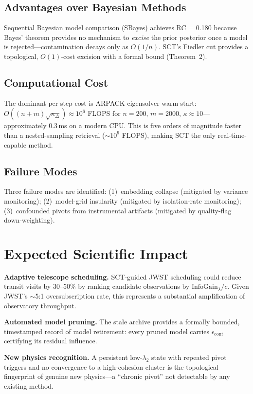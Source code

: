 \documentclass[conference]{IEEEtran}
\newcommand{\lam}{\lambda_2}
\newcommand{\epscont}{\epsilon_{\mathrm{cont}}}
\begin{document}
\subsection{Advantages over Bayesian Methods}
Sequential Bayesian model comparison (SBayes) achieves RC = 0.180 because
Bayes' theorem provides no mechanism to \emph{excise} the prior posterior
once a model is rejected---contamination decays only as $O(1/n)$.
SCT's Fiedler cut provides a topological, $O(1)$-cost excision with a formal
bound (Theorem~2).

\subsection{Computational Cost}
The dominant per-step cost is ARPACK eigensolver warm-start:
$O((n{+}m)\sqrt{\kappa_\Delta}) \approx 10^6$ FLOPS for $n=200$, $m=2000$,
$\kappa\approx10$---approximately 0.3\,ms on a modern CPU. This is
five orders of magnitude faster than a nested-sampling retrieval
($\sim$$10^9$ FLOPS), making SCT the only real-time-capable method.

\subsection{Failure Modes}
Three failure modes are identified: (1)~embedding collapse (mitigated by
variance monitoring); (2)~model-grid insularity (mitigated by isolation-rate
monitoring); (3)~confounded pivots from instrumental artifacts (mitigated by
quality-flag down-weighting).

\section{Expected Scientific Impact}\label{sec:impact}

\textbf{Adaptive telescope scheduling.} SCT-guided JWST scheduling could
reduce transit visits by 30--50\% by ranking candidate observations by
$\mathrm{InfoGain}_\lambda/c$. Given JWST's $\sim$5:1 oversubscription rate,
this represents a substantial amplification of observatory throughput.

\textbf{Automated model pruning.} The stale archive provides a formally
bounded, timestamped record of model retirement: every pruned model carries
$\epscont$ certifying its residual influence.

\textbf{New physics recognition.} A persistent low-$\lam$ state with
repeated pivot triggers and no convergence to a high-cohesion cluster is the
topological fingerprint of genuine new physics---a ``chronic pivot'' not
detectable by any existing method.
\end{document}
